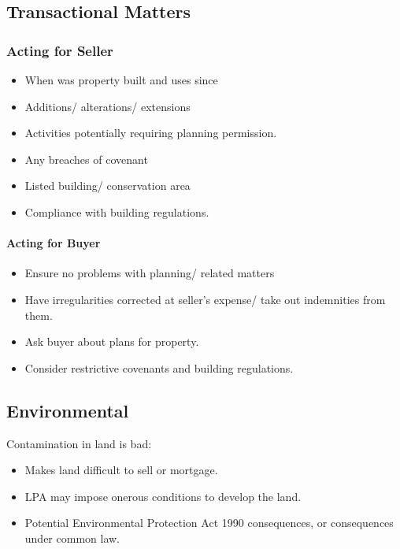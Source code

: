\documentclass[
]{article}
\providecommand{\tightlist}{%
  \setlength{\itemsep}{0pt}\setlength{\parskip}{0pt}}
\begin{document}
\hypertarget{transactional-matters}{%
\subsection{Transactional Matters}\label{transactional-matters}}

\hypertarget{acting-for-seller}{%
\subsubsection{Acting for Seller}\label{acting-for-seller}}

\begin{itemize}
\tightlist
\item
  When was property built and uses since
\item
  Additions/ alterations/ extensions
\item
  Activities potentially requiring planning permission.
\item
  Any breaches of covenant
\item
  Listed building/ conservation area
\item
  Compliance with building regulations.
\end{itemize}

\hypertarget{acting-for-buyer}{%
\paragraph{Acting for Buyer}\label{acting-for-buyer}}

\begin{itemize}
\tightlist
\item
  Ensure no problems with planning/ related matters
\item
  Have irregularities corrected at seller's expense/ take out
  indemnities from them.
\item
  Ask buyer about plans for property.
\item
  Consider restrictive covenants and building regulations.
\end{itemize}

\hypertarget{environmental}{%
\subsection{Environmental}\label{environmental}}

Contamination in land is bad:

\begin{itemize}
\tightlist
\item
  Makes land difficult to sell or mortgage.
\item
  LPA may impose onerous conditions to develop the land.
\item
  Potential Environmental Protection Act 1990 consequences, or
  consequences under common law.
\end{itemize}
\end{document}

